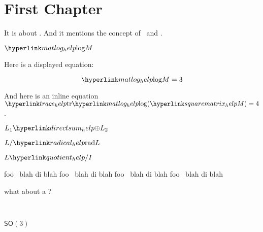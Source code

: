 \chapter{First Chapter}

It is about \liealgebra.  And it mentions the concept of \ideal\ and \subspace.


\trace

\matexp

\matlog

$\matlogmath M$

Here is a displayed equation:

\begin{equation}
\matlogmath M = 3
\end{equation}

And here is an inline equation $\tracemath\matlogmath(\squarematrixMmath)=4$.



\slncmg %
\slncla %

\jordan

\SOthree

\glmg

\sola  

\spla

$L_1\directsummath L_2$

$L/\radicalidealmath L$

\nnf

\ideal

\liealgebrahomo

\faithful

\module

\submodule

\adjoint

\bla

$L\quotientmath I$


\quotient

\centre

\normsub

\simple

\glv


\semisimple foo \semisimple\ blah di blah
\semisimple foo \semisimple\ blah di blah
\semisimple foo \semisimple\ blah di blah
\semisimple foo \semisimple\ blah di blah


\killing

what about a \derivation?

\nilpotentliealgebra\ \lowercentralseries 
\matrixliegroup

$\textsf{SO}(3)$


